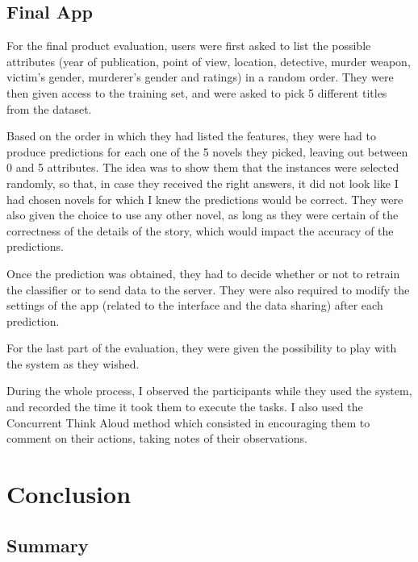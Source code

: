 \documentclass{mproj}
\begin{document}
\section{Final App}

For the final product evaluation, users were first asked to list the possible attributes (year of publication, point of view, location, detective, murder weapon, victim's gender, murderer's gender and ratings) in a random order. They were then given access to the training set, and were asked to pick 5 different titles from the dataset. \par

Based on the order in which they had listed the features, they were had to produce predictions for each one of the 5 novels they picked, leaving out between 0 and 5 attributes. The idea was to show them that the instances were selected randomly, so that, in case they received the right answers, it did not look like I had chosen novels for which I knew the predictions would be correct. They were also given the choice to use any other novel, as long as they were certain of the correctness of the details of the story, which would impact the accuracy of the predictions. \par 

Once the prediction was obtained, they had to decide whether or not to retrain the classifier or to send data to the server. They were also required to modify the settings of the app (related to the interface and the data sharing) after each prediction. \par

For the last part of the evaluation, they were given the possibility to play with the system as they wished.\par

During the whole process, I observed the participants while they used the system, and recorded the time it took them to execute the tasks. I also used the Concurrent Think Aloud method \cite{usabilitytest} which consisted in encouraging them to comment on their actions, taking notes of their observations.


\chapter{Conclusion}\label{conclusion}

\section{Summary}
\end{document}
